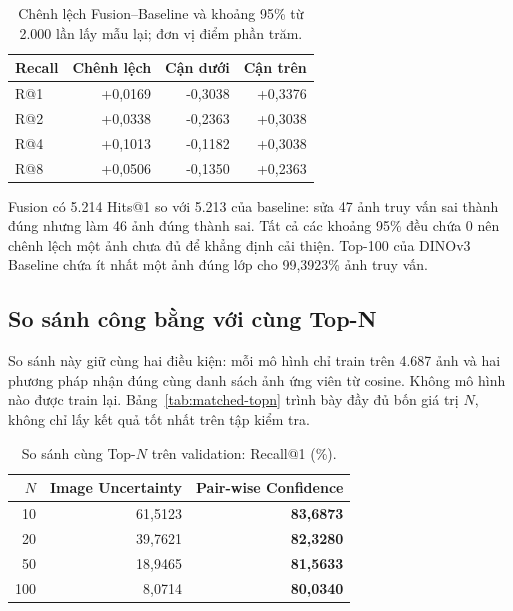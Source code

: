 \documentclass[11pt,a4paper]{article}
\begin{document}
\begin{table}[htbp]
\centering
\caption{Chênh lệch Fusion--Baseline và khoảng 95\% từ 2.000 lần lấy mẫu lại;
đơn vị điểm phần trăm.}
\begin{tabular}{@{}lrrr@{}}
\toprule Recall & Chênh lệch & Cận dưới & Cận trên\\ \midrule
R@1 & +0,0169 & -0,3038 & +0,3376\\
R@2 & +0,0338 & -0,2363 & +0,3038\\
R@4 & +0,1013 & -0,1182 & +0,3038\\
R@8 & +0,0506 & -0,1350 & +0,2363\\
\bottomrule
\end{tabular}
\end{table}
Fusion có 5.214 Hits@1 so với 5.213 của baseline: sửa 47 ảnh truy vấn sai
thành đúng nhưng làm 46 ảnh đúng thành sai. Tất cả các khoảng 95\% đều chứa
0 nên chênh lệch một ảnh chưa đủ để khẳng định cải thiện. Top-100 của
DINOv3 Baseline chứa ít nhất một ảnh đúng lớp cho 99,3923\% ảnh truy vấn.

\subsection{So sánh công bằng với cùng Top-N}

So sánh này giữ cùng hai điều kiện: mỗi mô hình chỉ train trên 4.687 ảnh và
hai phương pháp nhận đúng cùng danh sách ảnh ứng viên từ cosine. Không mô
hình nào được train lại. Bảng~\ref{tab:matched-topn} trình bày đầy đủ bốn
giá trị $N$, không chỉ lấy kết quả tốt nhất trên tập kiểm tra.

\begin{table}[htbp]
\centering
\caption{So sánh cùng Top-$N$ trên validation: Recall@1 (\%).}
\begin{tabular}{@{}rrr@{}}
\toprule
$N$ & Image Uncertainty & Pair-wise Confidence\\
\midrule
10  & 61,5123 & \textbf{83,6873}\\
20  & 39,7621 & \textbf{82,3280}\\
50  & 18,9465 & \textbf{81,5633}\\
100 & 8,0714  & \textbf{80,0340}\\
\bottomrule
\end{tabular}
\end{table}
\end{document}
